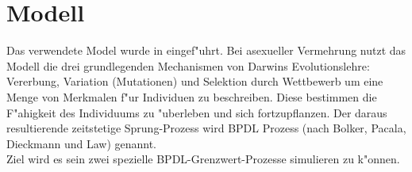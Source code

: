 \documentclass[11pt, a4paper, german]{article}
\theoremstyle{plain}
\begin{document}

\clearpage
\section{Modell}
Das verwendete Model wurde in \cite{Bolker_Spatial_moment,Bolker1997179,raey_Dieckmann_Law} eingef"uhrt. Bei asexueller Vermehrung nutzt das Modell die drei grundlegenden Mechanismen von Darwins Evolutionslehre: Vererbung, Variation (Mutationen) und Selektion durch Wettbewerb um eine Menge von Merkmalen f"ur Individuen zu beschreiben. Diese bestimmen die F"ahigkeit des Individuums zu "uberleben und sich fortzupflanzen. Der daraus resultierende zeitstetige Sprung-Prozess wird BPDL Prozess (nach Bolker, Pacala, Dieckmann und Law) genannt.\\
Ziel wird es sein  zwei spezielle BPDL-Grenzwert-Prozesse simulieren zu k"onnen.
\end{document}
